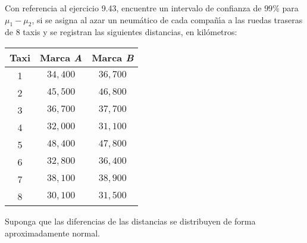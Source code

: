 \begin{enunciado}
 Con referencia al ejercicio 9.43, encuentre un intervalo de confianza de $99\%$ para $\mu_1 - \mu_2$, si se asigna al azar un neum\'atico de cada compa\~n\'{\i}a a las ruedas traseras de $8$ taxis y se registran las siguientes distancias, en kil\'ometros:
 \begin{center}
  \begin{tabular}{ccc}
   \textbf{Taxi} & \textbf{Marca \textit{A}} & \textbf{Marca \textit{B}} \\
   \hline 
   1 & $34,400$ & $36,700$ \\
   2 & $45,500$ & $46,800$ \\
   3 & $36,700$ & $37,700$ \\
   4 & $32,000$ & $31,100$ \\
   5 & $48,400$ & $47,800$ \\
   6 & $32,800$ & $36,400$ \\
   7 & $38,100$ & $38,900$ \\
   8 & $30,100$ & $31,500$
  \end{tabular}
 \end{center}
 Suponga que las diferencias de las distancias se distribuyen de forma aproximadamente normal.
\end{enunciado}

